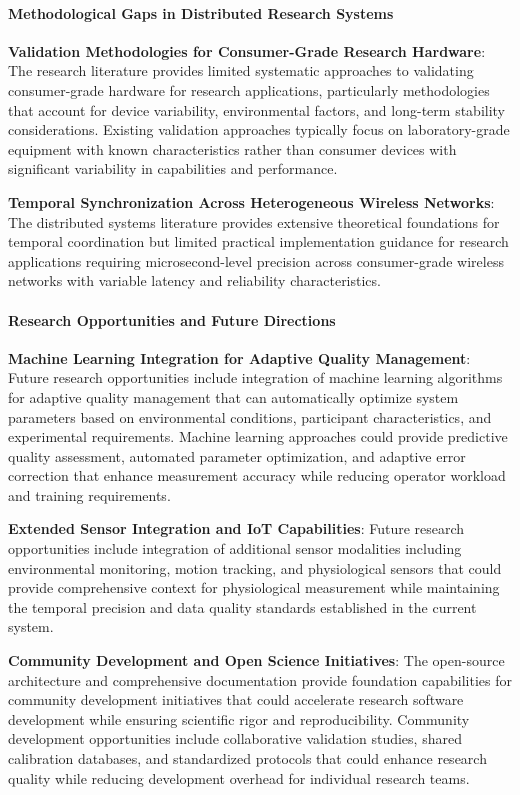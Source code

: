\documentclass[12pt,a4paper]{report}
\begin{document}
\paragraph{Methodological Gaps in Distributed Research Systems}

\textbf{Validation Methodologies for Consumer-Grade Research Hardware}: The research literature provides limited systematic
approaches to validating consumer-grade hardware for research applications, particularly methodologies that account for
device variability, environmental factors, and long-term stability considerations. Existing validation approaches
typically focus on laboratory-grade equipment with known characteristics rather than consumer devices with significant
variability in capabilities and performance.

\textbf{Temporal Synchronization Across Heterogeneous Wireless Networks}: The distributed systems literature provides
extensive theoretical foundations for temporal coordination but limited practical implementation guidance for research
applications requiring microsecond-level precision across consumer-grade wireless networks with variable latency and
reliability characteristics.

\paragraph{Research Opportunities and Future Directions}

\textbf{Machine Learning Integration for Adaptive Quality Management}: Future research opportunities include integration of
machine learning algorithms for adaptive quality management that can automatically optimize system parameters based on
environmental conditions, participant characteristics, and experimental requirements. Machine learning approaches could
provide predictive quality assessment, automated parameter optimization, and adaptive error correction that enhance
measurement accuracy while reducing operator workload and training requirements.

\textbf{Extended Sensor Integration and IoT Capabilities}: Future research opportunities include integration of additional
sensor modalities including environmental monitoring, motion tracking, and physiological sensors that could provide
comprehensive context for physiological measurement while maintaining the temporal precision and data quality standards
established in the current system.

\textbf{Community Development and Open Science Initiatives}: The open-source architecture and comprehensive documentation
provide foundation capabilities for community development initiatives that could accelerate research software
development while ensuring scientific rigor and reproducibility. Community development opportunities include
collaborative validation studies, shared calibration databases, and standardized protocols that could enhance research
quality while reducing development overhead for individual research teams.
\end{document}

